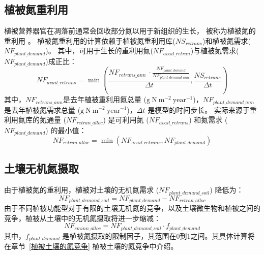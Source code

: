 \subsection{植被氮重利用}\label{植被氮重利用}
植被营养器官在凋落前通常会回收部分氮以用于新组织的生长，
被称为植被氮的重利用 \citep{magill1997biogeochemical,oikawa2005dynamics,son1991aboveground}。
植被氮重利用的计算依赖于植被氮重利用库($NS_{retrans}$)和植被氮需求($NF_{plant\_{demand}}$)。
其中，可用于生长的重利用氮($NF_{avail\_{retran}}$)与植被氮需求($NF_{plant\_{demand}}$)成正比：
\begin{equation}
NF_{avail\_retrans}=\min{\left(\frac{NF_{retrans\_ann}\ \cdot \frac{NF_{plant\_demand}}{NF_{plant\_demand\_ann}}}{{\Delta t}}, \frac{NS_{retrans}}{{\Delta t}}\right)}
\end{equation}
其中，$NF_{retrans\_ann}$是去年植被重利用氮总量 ($\mathrm{g\ N\ m^{-2}\ year^{-1}}$)，$NF_{plant\_demand\_ann}$ 是去年植被氮需求总量 ($\mathrm{g\ N\ m^{-2}\ year^{-1}}$)，${\Delta t}$ 是模型的时间步长。
实际来源于重利用氮库的氮通量 ($NF_{retran\_alloc}$) 是可利用氮 ($NF_{avail\_retrans}$) 和氮需求 ($NF_{plant\_demand}$) 的最小值：
\begin{equation}\label{NF_retran_alloc}
  NF_{retran\_alloc}=\min{\left(NF_{avail\_retrans}, NF_{plant\_demand}\right)}
\end{equation}


\subsection{土壤无机氮摄取}\label{土壤无机氮摄取}
由于植被氮的重利用，植被对土壤的无机氮需求 ($NF_{plant\_demand\_soil}$) 降低为：
\begin{equation}\label{NF_plant_demand_soil}
  NF_{plant\_demand\_soil} = NF_{plant\_demand} - NF_{retran\_alloc}	       
\end{equation}
由于不同植被功能型对于有限的土壤无机氮的竞争，以及土壤微生物和植被之间的竞争，植被从土壤中的无机氮摄取将进一步缩减：
\begin{equation}\label{NF_sminn_alloc}
NF_{sminn\_alloc} = NF_{plant\_demand\_soil}\cdot f_{plant\_demand}
\end{equation}
其中，$f_{plant\_demand}$ 是植被氮摄取的限制因子，其范围在0到1之间。其具体计算将在章节~\ref{植被土壤的氮竞争} 植被土壤的氮竞争中介绍。


